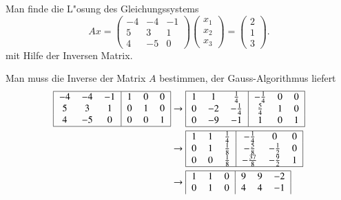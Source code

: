 \begin{beispiel}
Man finde die L"osung des Gleichungssystems
\[
Ax=
\begin{pmatrix}
  -4& -4& -1\\
   5&  3&  1\\
   4& -5&  0
\end{pmatrix}
\begin{pmatrix}x_1\\x_2\\x_3\end{pmatrix}
=
\begin{pmatrix}2\\1\\3\end{pmatrix}.
\]
mit Hilfe der Inversen Matrix.

\smallskip
{\parindent 0pt Man muss die Inverse der Matrix $A$ bestimmen,
der Gauss-Algorithmus liefert}
\begin{align*}
\begin{tabular}{|>{$}c<{$}>{$}c<{$}>{$}c<{$}|>{$}c<{$}>{$}c<{$}>{$}c<{$}|}
\hline
  -4& -4& -1 & 1& 0& 0\\
   5&  3&  1 & 0& 1& 0\\
   4& -5&  0 & 0& 0& 1\\
\hline
\end{tabular}
&\rightarrow
\begin{tabular}{|>{$}c<{$}>{$}c<{$}>{$}c<{$}|>{$}c<{$}>{$}c<{$}>{$}c<{$}|}
\hline
   1&  1& \frac14 &-\frac14& 0& 0\\
   0& -2&-\frac14 & \frac54& 1& 0\\
   0& -9& -1      & 1      & 0& 1\\
\hline
\end{tabular}
\\
&\rightarrow
\begin{tabular}{|>{$}c<{$}>{$}c<{$}>{$}c<{$}|>{$}c<{$}>{$}c<{$}>{$}c<{$}|}
\hline
   1&  1& \frac14 &-\frac14   &       0& 0\\
   0&  1& \frac18 &-\frac58   &-\frac12& 0\\
   0&  0& \frac18 &-\frac{37}8&-\frac92& 1\\
\hline
\end{tabular}
\\
&\rightarrow
\begin{tabular}{|>{$}c<{$}>{$}c<{$}>{$}c<{$}|>{$}c<{$}>{$}c<{$}>{$}c<{$}|}
\hline
   1&  1&       0 &       9   &       9&-2\\
   0&  1&       0 &       4   &       4&-1\\

\end{tabular}
\end{align*}
\end{beispiel}
